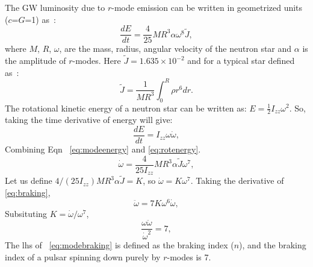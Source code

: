 \documentclass{ttuthes2007}
\begin{document}
The \ac{GW} luminosity due to $r$-mode emission can be written in geometrized
units ($c$=$G$=1) as~\cite{Owen_2010}:
\begin{equation}\label{eq:modeenergy}
\frac{dE}{dt}=\frac{4}{25}M R^3 \alpha \omega^8\tilde{J},
\end{equation}
where $M$, $R$, $\omega$, are the mass, radius, angular velocity of the neutron
star and $\alpha$ is the amplitude of $r$-modes. Here $\tilde{J}=1.635\times10^{-2}$ and
for a typical star defined as~\cite{Owen:1998xg}:
\begin{equation}
\tilde{J}=\frac{1}{MR^3}\int_0^R\rho r^6dr.
\end{equation}
The rotational kinetic energy of a neutron star can be written as:
$E=\frac{1}{2}I_{zz}\omega^2$. So, taking the time derivative of energy will give:
\begin{equation}\label{eq:rotenergy}
\frac{dE}{dt}= I_{zz}\omega\dot{\omega},
\end{equation}
Combining Eqn ~\ref{eq:modeenergy} and \ref{eq:rotenergy}.
\begin{equation}\label{eq:braking}
\dot{\omega}=\frac{4}{25 I_{zz}}M R^3 \alpha\tilde{J} \omega^7, 
\end{equation}
Let us define $4/(25 I_{zz})M R^3 \alpha\tilde{J}=K$, so $\dot{\omega}=K
\omega^7$. 
Taking the derivative of \ref{eq:braking},
\begin{equation}
\ddot{\omega}= 7K\omega^6\dot{\omega},
\end{equation}
Subsituting $K=\dot{\omega}/\omega^7$,
\begin{equation}\label{eq:modebraking}
\frac{\omega\ddot{\omega}}{\dot{\omega}^2}=7,
\end{equation}
The lhs of  ~\ref{eq:modebraking} is defined as the braking index ($n$), and the
braking index of a pulsar spinning down purely by $r$-modes is 7. 
\end{document}
